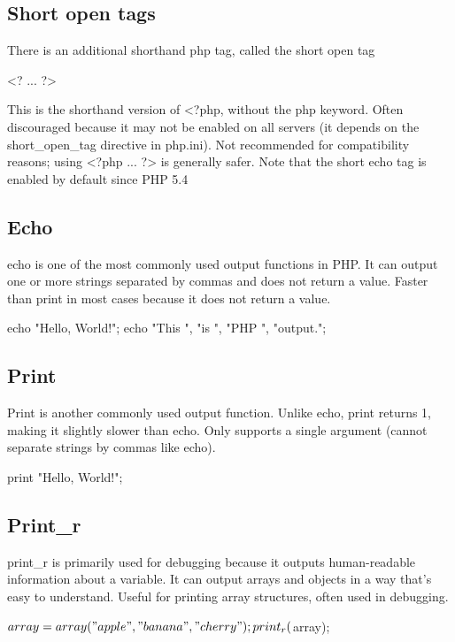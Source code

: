 \documentclass{report}
\begin{document}
    \subsection{Short open tags}
    \bigbreak \noindent 
    There is an additional shorthand php tag, called the short open tag
    \bigbreak \noindent 
    \begin{phpcode}
    <? ... ?>
    \end{phpcode}
    \bigbreak \noindent 
    This is the shorthand version of <?php, without the php keyword.
    \bigbreak \noindent 
    Often discouraged because it may not be enabled on all servers (it depends on the short\_open\_tag directive in php.ini).
    \bigbreak \noindent 
    Not recommended for compatibility reasons; using <?php ... ?> is generally safer.
    \bigbreak \noindent 
    Note that the short echo tag is enabled by default since PHP 5.4


    \pagebreak 
    \bigbreak \noindent 
    \subsection{Echo}
    \bigbreak \noindent 
    echo is one of the most commonly used output functions in PHP.
    \bigbreak \noindent 
    It can output one or more strings separated by commas and does not return a value.
    \bigbreak \noindent 
    Faster than print in most cases because it does not return a value.
    \bigbreak \noindent 
    \begin{phpcode}
        echo "Hello, World!";
        echo "This ", "is ", "PHP ", "output.";
    \end{phpcode}

    \bigbreak \noindent 
    \subsection{Print}
    \bigbreak \noindent 
    Print is another commonly used output function.
    \bigbreak \noindent 
    Unlike echo, print returns 1, making it slightly slower than echo.
    \bigbreak \noindent 
    Only supports a single argument (cannot separate strings by commas like echo).
    \bigbreak \noindent 
    \begin{phpcode}
    print "Hello, World!";
    \end{phpcode}

    \bigbreak \noindent 
    \subsection{Print\_r}
    \bigbreak \noindent 
    print\_r is primarily used for debugging because it outputs human-readable information about a variable.
    \bigbreak \noindent 
    It can output arrays and objects in a way that’s easy to understand.
    \bigbreak \noindent 
    Useful for printing array structures, often used in debugging.
    \bigbreak \noindent 
    \begin{phpcode}
        $array = array("apple", "banana", "cherry");
        print_r($array);
    \end{phpcode}
\end{document}
